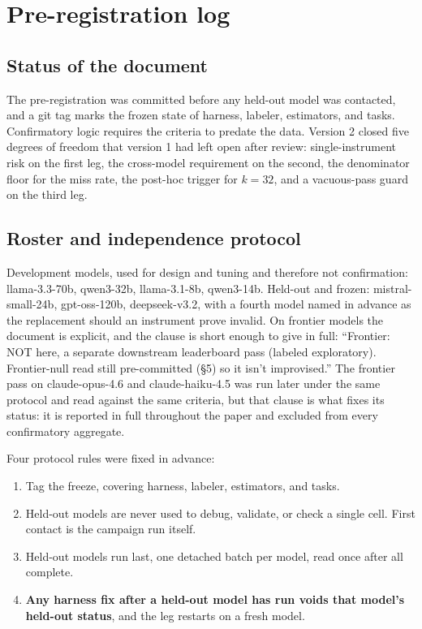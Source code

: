 

\section{Pre-registration log}
\label{app:prereg}

\subsection{Status of the document}

The pre-registration was committed before any held-out model was contacted, and a
git tag marks the frozen state of harness, labeler, estimators, and tasks.
Confirmatory logic requires the criteria to predate the data. Version 2 closed
five degrees of freedom that version 1 had left open after review:
single-instrument risk on the first leg, the cross-model requirement on the
second, the denominator floor for the miss rate, the post-hoc trigger for
$k=32$, and a vacuous-pass guard on the third leg.

\subsection{Roster and independence protocol}

Development models, used for design and tuning and therefore not confirmation:
llama-3.3-70b, qwen3-32b, llama-3.1-8b, qwen3-14b. Held-out and frozen:
mistral-small-24b, gpt-oss-120b, deepseek-v3.2, with a fourth model named in
advance as the replacement should an instrument prove invalid. On frontier
models the document is explicit, and the clause is short enough to give in full:
``Frontier: NOT here, a separate downstream leaderboard pass (labeled
exploratory). Frontier-null read still pre-committed (\S5) so it isn't
improvised.'' The frontier pass on claude-opus-4.6 and claude-haiku-4.5 was run
later under the same protocol and read against the same criteria, but that
clause is what fixes its status: it is reported in full throughout the paper and
excluded from every confirmatory aggregate.

Four protocol rules were fixed in advance:

\begin{enumerate}
\item Tag the freeze, covering harness, labeler, estimators, and tasks.
\item Held-out models are never used to debug, validate, or check a single cell.
First contact is the campaign run itself.
\item Held-out models run last, one detached batch per model, read once after all
complete.
\item \textbf{Any harness fix after a held-out model has run voids that model's
held-out status}, and the leg restarts on a fresh model.
\end{enumerate}


